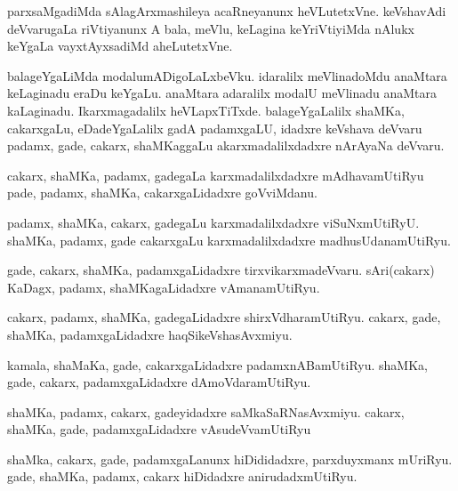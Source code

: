 \documentclass{article}
\begin{document}
\begin{mn}%
parxsaMgadiMda sAlagArxmashileya acaRneyanunx heVLutetxVne. keVshavAdi deVvarugaLa 
riVtiyanunx A bala, meVlu, keLagina keYriVtiyiMda nAlukx keYgaLa vayxtAyxsadiMd aheLutetxVne.
\end{mn}

\begin{mn}%
balageYgaLiMda modalumADigoLaLxbeVku. idaralilx meVlinadoMdu anaMtara keLaginadu eraDu 
keYgaLu. anaMtara adaralilx modalU meVlinadu anaMtara kaLaginadu. Ikarxmagadalilx 
heVLapxTiTxde. balageYgaLalilx shaMKa, cakarxgaLu, eDadeYgaLalilx gadA padamxgaLU, idadxre 
keVshava deVvaru padamx, gade, cakarx, shaMKaggaLu akarxmadalilxdadxre nArAyaNa deVvaru.
\end{mn}

\begin{mn}%
cakarx, shaMKa, padamx, gadegaLa karxmadalilxdadxre mAdhavamUtiRyu pade, padamx, shaMKa, 
cakarxgaLidadxre goVviMdanu.
\end{mn}

\begin{mn}%
padamx, shaMKa, cakarx, gadegaLu karxmadalilxdadxre viSuNxmUtiRyU. shaMKa, padamx, gade 
cakarxgaLu karxmadalilxdadxre madhusUdanamUtiRyu.
\end{mn}


\begin{mn}%
gade, cakarx, shaMKa, padamxgaLidadxre tirxvikarxmadeVvaru. sAri(cakarx) KaDagx, padamx, 
shaMKagaLidadxre vAmanamUtiRyu.
\end{mn}

\begin{mn}%
cakarx, padamx, shaMKa, gadegaLidadxre shirxVdharamUtiRyu. cakarx, gade, shaMKa, 
padamxgaLidadxre haqSikeVshasAvxmiyu.
\end{mn}

\begin{mn}%
kamala, shaMaKa, gade, cakarxgaLidadxre padamxnABamUtiRyu. shaMKa, gade, cakarx, 
padamxgaLidadxre dAmoVdaramUtiRyu.
\end{mn}

\begin{mn}%
shaMKa, padamx, cakarx, gadeyidadxre saMkaSaRNasAvxmiyu. cakarx, shaMKa, gade, 
padamxgaLidadxre vAsudeVvamUtiRyu
\end{mn}

\begin{mn}%
shaMka, cakarx, gade, padamxgaLanunx hiDididadxre, parxduyxmanx mUriRyu. gade, shaMKa, 
padamx, cakarx hiDidadxre anirudadxmUtiRyu.
\end{mn}
\end{document}
